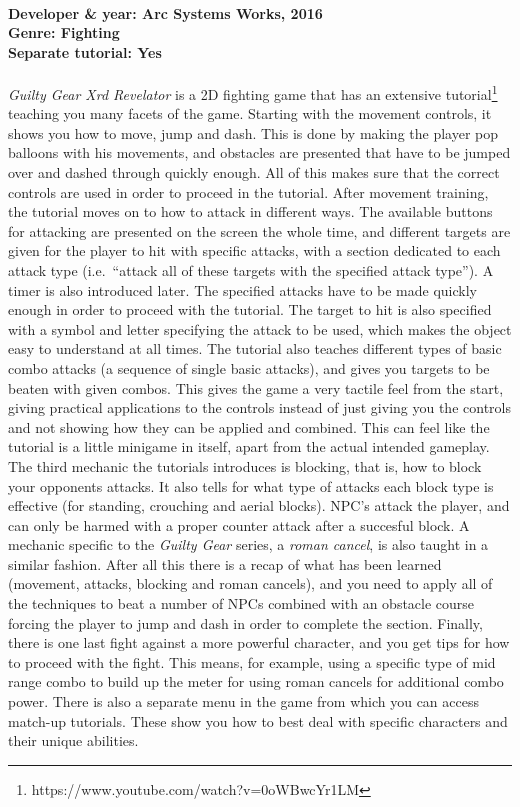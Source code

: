 \paragraph{Developer \& year: Arc Systems Works, 2016 \\ Genre: Fighting \\ Separate tutorial: Yes \\}
\textit{Guilty Gear Xrd Revelator} is a 2D fighting game that has an extensive tutorial\footnote{https://www.youtube.com/watch?v=0oWBwcYr1LM}
teaching you many facets of the game. Starting with the movement controls, it
shows you how to move, jump and dash. This is done by making the player pop
balloons with his movements, and obstacles are presented that have to be
jumped over and dashed through quickly enough. All of this makes sure that the correct controls are used in
order to proceed in the tutorial.
After movement training, the tutorial moves on to how to attack in different
ways. The available buttons for attacking are presented on the screen the
whole time, and different targets are given for the player to hit with
specific attacks, with a section dedicated to each attack type (i.e.\ ``attack all of these targets with the specified attack type''). A timer is also
introduced later. The specified attacks have to be made quickly enough in
order to proceed with the tutorial. The target to hit is also specified with a
symbol and letter specifying the attack to be used, which makes the object
easy to understand at all times. The tutorial also teaches different types of
basic combo attacks (a sequence of single basic attacks), and gives you targets to be beaten with given combos.
This gives the game a very tactile feel from the start, giving practical
applications to the controls instead of just giving you the controls and not
showing how they can be applied and combined. This can feel like the tutorial is a little
minigame in itself, apart from the actual intended gameplay.
The third mechanic the tutorials introduces is blocking, that is, how to block
your opponents attacks. It also tells for what type of attacks each block
type is effective (for standing, crouching and aerial blocks). NPC's attack
the player, and can only be harmed with a proper counter attack after a
succesful block. A mechanic specific to the \textit{Guilty Gear} series, a \textit{roman cancel}, is also taught in a similar fashion.
After all this there is a recap of what has been learned (movement, attacks,
blocking and roman cancels), and you need to apply all of the techniques to
beat a number of NPCs combined with an obstacle course forcing the player to
jump and dash in order to complete the section. Finally, there is one last
fight against a more powerful character, and you get tips for how to proceed
with the fight. This means, for example, using a specific type of mid range combo to
build up the meter for using roman cancels for additional combo power.
There is also a separate menu in the game from which you can access match-up
tutorials. These show you how to best deal with specific characters and their
unique abilities.

